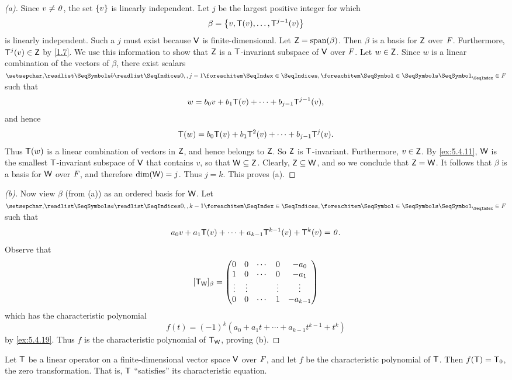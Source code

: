 \begin{proof}[(a)]
	Since \(v \neq \mathit{0}\), the set \(\left\lbrace v\right\rbrace\) is linearly independent.
	Let \(j\) be the largest positive integer for which
	\[
		\beta = \left\lbrace v, \mathsf{T}(v), \dots, \mathsf{T}^{j - 1}(v)\right\rbrace
	\]
	is linearly independent.
	Such a \(j\) must exist because \(\mathsf{V}\) is finite-dimensional.
	Let \(\vs{Z} = \spn{\beta}\).
	Then \(\beta\) is a basis for \(\mathsf{Z}\) over \(\mathit{F}\).
	Furthermore, \(\mathsf{T}^j(v) \in \mathsf{Z}\) by \cref{1.7}.
	We use this information to show that \(\mathsf{Z}\) is a \(\mathsf{T}\)-invariant subspace of \(\mathsf{V}\) over \(\mathit{F}\).
	Let \(w \in \mathsf{Z}\).
	Since \(w\) is a linear combination of the vectors of \(\beta\), there exist scalars \(\seq{b}{0,,j-1} \in \F\) such that
	\[
		w = b_0 v + b_1 \mathsf{T}(v) + \cdots + b_{j - 1} \mathsf{T}^{j - 1}(v),
	\]
	and hence
	\[
		\mathsf{T}(w) = b_0 \mathsf{T}(v) + b_1 \mathsf{T}^2(v) + \cdots + b_{j - 1} \mathsf{T}^j(v).
	\]
	Thus \(\mathsf{T}(w)\) is a linear combination of vectors in \(\mathsf{Z}\), and hence belongs to \(\mathsf{Z}\).
	So \(\mathsf{Z}\) is \(\mathsf{T}\)-invariant.
	Furthermore, \(v \in \mathsf{Z}\).
	By \cref{ex:5.4.11}, \(\mathsf{W}\) is the smallest \(\mathsf{T}\)-invariant subspace of \(\mathsf{V}\) that contains \(v\), so that \(\mathsf{W} \subseteq \mathsf{Z}\).
	Clearly, \(\mathsf{Z} \subseteq \mathsf{W}\), and so we conclude that \(\mathsf{Z} = \mathsf{W}\).
	It follows that \(\beta\) is a basis for \(\mathsf{W}\) over \(\mathit{F}\), and therefore \(\dim(\mathsf{W}) = j\).
	Thus \(j = k\).
	This proves (a).
\end{proof}

\begin{proof}[(b)]
	Now view \(\beta\) (from (a)) as an ordered basis for \(\mathsf{W}\).
	Let \(\seq{a}{0,,k-1} \in \F\) such that
	\[
		a_0 v + a_1 \mathsf{T}(v) + \cdots + a_{k - 1} \mathsf{T}^{k - 1}(v) + \mathsf{T}^k(v) = \mathit{0}.
	\]
	Observe that
	\[
		[\mathsf{T}_{\mathsf{W}}]_{\beta} = \begin{pmatrix}
			0      & 0      & \cdots & 0      & -a_0       \\
			1      & 0      & \cdots & 0      & -a_1       \\
			\vdots & \vdots &        & \vdots & \vdots     \\
			0      & 0      & \cdots & 1      & -a_{k - 1}
		\end{pmatrix}
	\]
	which has the characteristic polynomial
	\[
		f(t) = (-1)^k (a_0 + a_1 t + \cdots + a_{k - 1} t^{k - 1} + t^k)
	\]
	by \cref{ex:5.4.19}.
	Thus \(f\) is the characteristic polynomial of \(\mathsf{T}_{\mathsf{W}}\), proving (b).
\end{proof}

\begin{thm}\label{5.23}
	Let \(\mathsf{T}\) be a linear operator on a finite-dimensional vector space \(\mathsf{V}\) over \(\mathit{F}\), and let \(f\) be the characteristic polynomial of \(\mathsf{T}\).
	Then \(f(\mathsf{T}) = \mathsf{T}_0\), the zero transformation.
	That is, \(\mathsf{T}\) ``satisfies'' its characteristic equation.
\end{thm}

